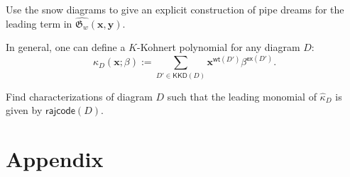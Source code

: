 \documentclass[ALCO]{cedram}
\newcommand{\fG}{\mathfrak{G}}
\newcommand{\KKD}{\mathsf{KKD}}
\newcommand{\wt}{\mathsf{wt}}
\newcommand{\ex}{\mathsf{ex}}
\newcommand{\rajcode}{\mathsf{rajcode}}
\begin{document}
\begin{prob}
Use the snow diagrams to give an explicit construction of pipe dreams for the leading term
in $\widehat{\fG_w}(\bm{x},\bm{y})$.
\end{prob}

In general, one can define a $K$-Kohnert polynomial for any diagram $D$:
\[
\kappa_D(\bm{x};\beta) := \sum_{D'\in \KKD(D)}\bm{x}^{\wt(D')} \beta^{\ex(D')}.
\]

\begin{prob}
Find characterizations of diagram $D$ such that the leading monomial of $\widehat{\kappa}_D$ is given by $\rajcode(D)$.
\end{prob}

\section{Appendix}
\label{appendix}
\end{document}
